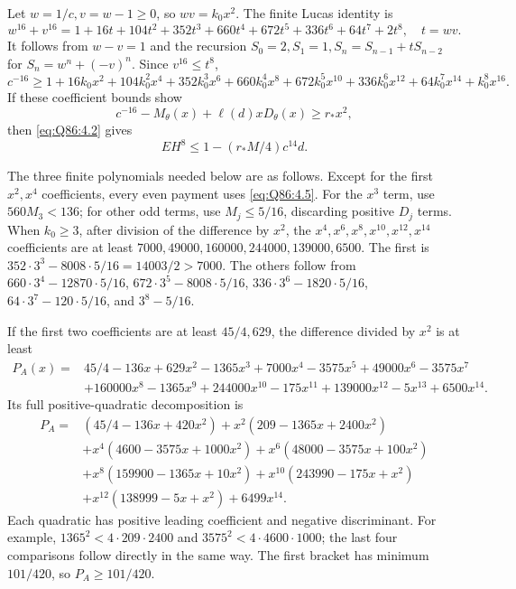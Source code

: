 Let \(w=\allowbreak 1/c,\allowbreak v=\allowbreak w-1\ge\allowbreak 0\), so \(wv=\allowbreak k_0x^2\).
The finite Lucas identity is
\[
w^{16}+v^{16}=1+16t+104t^2+352t^3+660t^4
 +672t^5+336t^6+64t^7+2t^8,\quad t=wv.
\]
It follows from \(w-v=\allowbreak 1\) and the recursion
\(S_0=\allowbreak 2,\allowbreak S_1=\allowbreak 1,\allowbreak S_n=\allowbreak S_{n-1}+tS_{n-2}\) for
\(S_n=\allowbreak w^n+(-v)^n\).
Since \(v^{16}\le\allowbreak  t^8\),
\[
c^{-16}\ge1+16k_0x^2+104k_0^2x^4+352k_0^3x^6+660k_0^4x^8
 +672k_0^5x^{10}+336k_0^6x^{12}+64k_0^7x^{14}+k_0^8x^{16}.
\tag{Q86.4.5}\label{eq:Q86:4.5}
\]
If these coefficient bounds show
\[
c^{-16}-M_\theta(x)+\ell(d)xD_\theta(x)\ge r_*x^2,
\tag{Q86.4.6}\label{eq:Q86:4.6}
\]
then \eqref{eq:Q86:4.2} gives
\[
\boxed{EH^8\le1-(r_*M/4)c^{14}d.}
\tag{Q86.4.7}\label{eq:Q86:4.7}
\]

The three finite polynomials needed below are as follows.
Except for the first \(x^2,\allowbreak x^4\) coefficients, every even payment uses
\eqref{eq:Q86:4.5}.
For the \(x^3\) term, use \(560M_3<\allowbreak 136\);
for other odd terms, use \(M_j\le\allowbreak 5/16\), discarding positive \(D_j\) terms.
When \(k_0\ge\allowbreak 3\), after division of the difference by \(x^2\), the
\(x^4,\allowbreak x^6,\allowbreak x^8,\allowbreak x^{10},\allowbreak x^{12},\allowbreak x^{14}\) coefficients are at least
\(7000,\allowbreak 49000,\allowbreak 160000,\allowbreak 244000,\allowbreak 139000,\allowbreak 6500\).
The first is
\(352\cdot3^3-8008\cdot5/16=\allowbreak 14003/2>\allowbreak 7000\).
The others follow from
\(660\cdot3^4-12870\cdot5/16\),
\(672\cdot3^5-8008\cdot5/16\),
\(336\cdot3^6-1820\cdot5/16\),
\(64\cdot3^7-120\cdot5/16\), and \(3^8-5/16\).

If the first two coefficients are at least \(45/4,\allowbreak 629\), the difference divided by \(x^2\) is at least
\[
\begin{split}
P_A(x)={}&45/4-136x+629x^2-1365x^3+7000x^4-3575x^5
 +49000x^6-3575x^7\\
 &+160000x^8-1365x^9+244000x^{10}-175x^{11}
 +139000x^{12}-5x^{13}+6500x^{14}.
\end{split}
\]
Its full positive-quadratic decomposition is
\[
\begin{split}
P_A={}&(45/4-136x+420x^2)+x^2(209-1365x+2400x^2)\\
&+x^4(4600-3575x+1000x^2)+x^6(48000-3575x+100x^2)\\
&+x^8(159900-1365x+10x^2)+x^{10}(243990-175x+x^2)\\
&+x^{12}(138999-5x+x^2)+6499x^{14}.
\end{split}
\tag{Q86.4.8}\label{eq:Q86:4.8}
\]
Each quadratic has positive leading coefficient and negative discriminant.
For example, \(1365^2<\allowbreak 4\cdot209\cdot2400\) and
\(3575^2<\allowbreak 4\cdot4600\cdot1000\); the last four comparisons follow directly in the same way.
The first bracket has minimum \(101/420\), so \(P_A\ge\allowbreak 101/420\).

